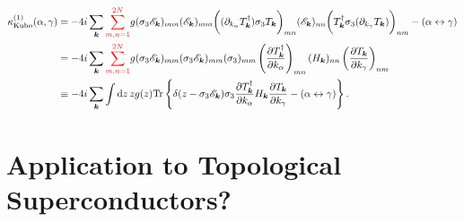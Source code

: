 \documentclass[10pt,nofootinbib]{revtex4}
\newcommand*\dd{\mathop{}\!\mathrm{d}}
\begin{document}
		\begin{align}
			\kappa_{\text{Kubo}}^{(1)}(\alpha,\gamma)&=-4i\sum_{\bm{k}}{\color{red}\sum_{m,n=1}^{2N}} g(\sigma_3\mathscr{E}_{\bm{k}})_{mm}(\mathscr{E}_{\bm{k}})_{mm}\bigg((\partial_{k_\alpha}T_{\bm{k}}^\dagger)\sigma_3 T_{\bm{k}}\bigg)_{mn}(\mathscr{E}_{\bm{k}})_{nn}\bigg(T_{\bm{k}}^\dagger\sigma_3 (\partial_{k_\gamma}T_{\bm{k}})\bigg)_{nm}-(\alpha\leftrightarrow\gamma)\nonumber\\
			&=-4i\sum_{\bm{k}}{\color{red}\sum_{m,n=1}^{2N}} g(\sigma_3\mathscr{E}_{\bm{k}})_{mm}(\sigma_3\mathscr{E}_{\bm{k}})_{mm}(\sigma_3)_{mm}\left(\dfrac{\partial T_{\bm{k}}^\dagger}{\partial k_\alpha}\right)_{mn}(H_{\bm{k}})_{nn}\left(\dfrac{\partial T_{\bm{k}}}{\partial k_\gamma}\right)_{nm}\nonumber\\
			&\equiv-4i\sum_{\bm{k}}\int\dd z\,zg(z)\mathrm{Tr}\left\{\delta(z-\sigma_3\mathscr{E}_{\bm{k}})\sigma_3\dfrac{\partial T_{\bm{k}}^\dagger}{\partial k_\alpha}H_{\bm{k}}\dfrac{\partial T_{\bm{k}}}{\partial k_\gamma}-(\alpha\leftrightarrow\gamma)\right\}.
		\end{align}
\fi


\section{Application to Topological Superconductors?}
	


\end{document}
